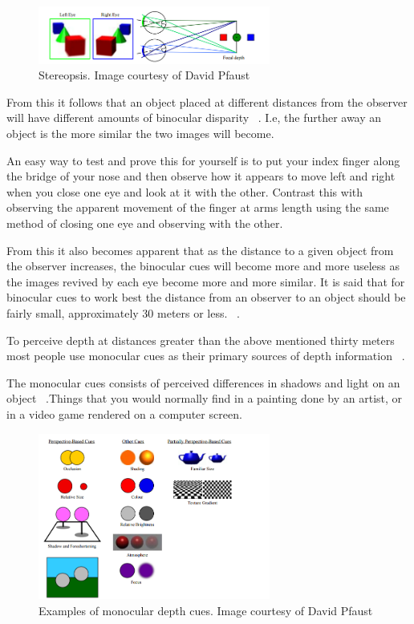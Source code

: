 \documentclass[tog]{acmsiggraph}
\begin{document}
\begin{figure}[ht]
	\centering
	\includegraphics[width=3.0in]{images/depthCuesBinocular}
	\caption{Stereopsis. Image courtesy of David Pfaust  }
	\label{fig:DepthPerception}
\end{figure}

From this it follows that an object placed at different distances from the observer will have different amounts of binocular disparity ~\cite {Boyd:2000:DPC}. I.e, the further away an object is the more similar the two images will become. 

An easy way to test and prove this for yourself is to put your index finger along the bridge of your nose and then observe how it appears to move left and right when you close one eye and look at it with the other. Contrast this with observing the apparent movement of the finger at arms length using the same method of closing one eye and observing with the other.   
 
From this it also becomes apparent that as the distance to a given object from the observer increases, the binocular cues will become more and more useless as the images revived by each eye become more and more similar. It is said that for binocular cues to work best the distance from an observer to an object should be fairly small, approximately 30 meters or less. ~\cite {Palvqvist:2013:DPDS}.

To perceive depth at distances greater than the above mentioned thirty meters most people use monocular cues as their primary sources of depth information ~\cite {Palvqvist:2013:DPDS}. 

The monocular cues consists of perceived differences in shadows and light on an object ~\cite {Pfautz:2002:DPCG}.Things that you would normally find in a painting done by an artist, or in a video game rendered on a computer screen.

\begin{figure}[ht]
	\centering
	\includegraphics[width=3.0in]{images/depthCues}
	\caption{Examples of monocular depth cues. Image courtesy of David Pfaust}
	\label{fig:DepthPerception}
\end{figure}
\end{document}
